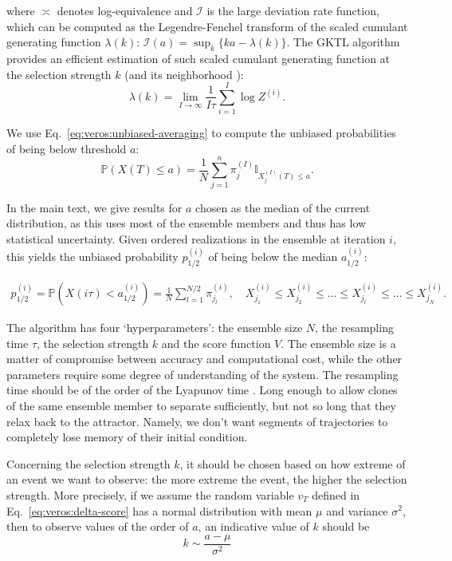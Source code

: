 where $\asymp$ denotes log-equivalence and $\mathcal{I}$ is the large deviation rate function, which can be computed as the Legendre-Fenchel transform of the scaled cumulant generating function $\lambda(k)$: $\mathcal{I}(a) = \sup_k \{ka - \lambda(k)\}$.
The GKTL algorithm provides an efficient estimation of such scaled cumulant generating function at the selection strength $k$ (and its neighborhood \cite{RAG20}):
\begin{equation}
    \lambda(k) = \lim_{I \to \infty} \frac{1}{I\tau} \sum_{i=1}^{I} \log{Z^{(i)}}.
\end{equation}


We use Eq.~\ref{eq:veros:unbiased-averaging} to compute the unbiased probabilities of being below threshold $a$:
\begin{equation}\label{eq:veros:unbiased-probabilities}
        \mathbb{P} (X(T) \leq a) = \frac{1}{N} \sum_{j=1}^{n} \pi_j^{(I)} \mathbb{I}_{X_j^{(I)}(T) \leq a}.
\end{equation}

In the main text, we give results for $a$ chosen as the median of the current distribution, as this uses most of the ensemble members and thus has low statistical uncertainty. Given ordered realizations in the ensemble at iteration $i$, this yields the unbiased probability $p_{1/2}^{(i)}$ of being below the median $a^{(i)}_{1/2}$:

\begin{gather}\label{eq:veros:p0.5}
        p_{1/2}^{(i)} = \mathbb{P}(X(i\tau) < a^{(i)}_{1/2}) = \frac{1}{N} \sum_{l=1}^{N/2} \pi_{j_l}^{(i)}, \quad X_{j_1}^{(i)} \leq X_{j_2}^{(i)} \leq \ldots \leq X_{j_{l}}^{(i)} \leq \ldots \leq X_{j_{N}}^{(i)} .
\end{gather}

The algorithm has four `hyperparameters': the ensemble size $N$, the resampling time $\tau$, the selection strength $k$ and the score function $V$. The ensemble size is a matter of compromise between accuracy and computational cost, while the other parameters require some degree of understanding of the system. The resampling time should be of the order of the Lyapunov time \cite{WOU16}. Long enough to allow clones of the same ensemble member to separate sufficiently, but not so long that they relax back to the attractor. Namely, we don't want segments of trajectories to completely lose memory of their initial condition.

Concerning the selection strength $k$, it should be chosen based on how extreme of an event we want to observe: the more extreme the event, the higher the selection strength. More precisely, if we assume the random variable $v_T$ defined in Eq.~\ref{eq:veros:delta-score} has a normal distribution with mean $\mu$ and variance $\sigma^2$, then to observe values of the order of $a$, an indicative value of $k$ should be
\begin{equation}\label{eq:veros:suggested-k}
    k \sim \frac{a - \mu}{\sigma^2}
\end{equation}


